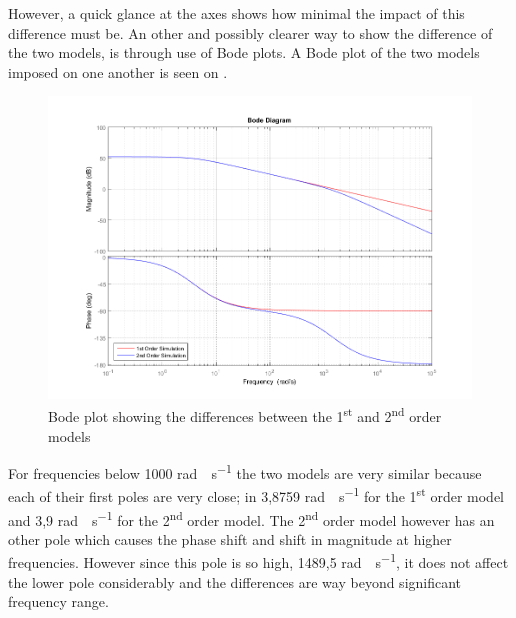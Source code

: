 However, a quick glance at the axes shows how minimal the impact of this difference must be. An other and possibly clearer way to show the difference of the two models, is through use of Bode plots. A Bode plot of the two models imposed on one another is seen on .
%
\begin{figure}[H]
	\centering
	\includegraphics[width=1 \textwidth]{figures/bodePlotOf1stAnd2ndOrderModel.png}
	\caption{Bode plot showing the differences between the \si{1^{st}} and \si{2^{nd}} order models}
	\label{fig:bodePlotOf1stAnd2ndOrderModel}
\end{figure}
%
For frequencies below 1000 \si{rad\cdot s^{-1}} the two models are very similar because each of their first poles are very close; in 3,8759 \si{rad\cdot s^{-1}} for the \si{1^{st}} order model and 3,9 \si{rad\cdot s^{-1}} for the \si{2^{nd}} order model. The \si{2^{nd}} order model however has an other pole which causes the phase shift and shift in magnitude at higher frequencies. However since this pole is so high, 1489,5 \si{rad\cdot s^{-1}}, it does not affect the lower pole considerably and the differences are way beyond significant frequency range.

